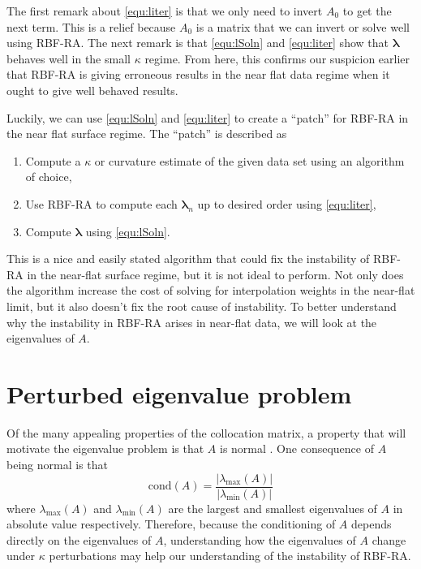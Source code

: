 \documentclass[a4paper,11pt]{article}
\newcommand{\abs}[1]{\left| #1 \right|}
\newcommand{\cond}{\mathrm{cond}}
\newcommand{\bl}{\pmb{\lambda}}
\begin{document}
The first remark about \eqref{equ:liter} is that we only need to invert $ A_0 $ to get the next term. This is a relief because $ A_0 $ is a matrix that we can invert or solve well using RBF-RA. The next remark is that \eqref{equ:lSoln} and \eqref{equ:liter} show that $ \bl $ behaves well in the small $ \kappa $ regime. From here, this confirms our suspicion earlier that RBF-RA is giving erroneous results in the near flat data regime when it ought to give well behaved results.

Luckily, we can use \eqref{equ:lSoln} and \eqref{equ:liter} to create a ``patch'' for RBF-RA in the near flat surface regime. The ``patch'' is described as
\begin{enumerate}[label = (\alph*), itemsep = 0cm, topsep = 0cm]
	\item Compute a $ \kappa $ or curvature estimate of the given data set using an algorithm of choice,
	\item Use RBF-RA to compute each $ \bl_n $ up to desired order using \eqref{equ:liter},
	\item Compute $ \bl $ using \eqref{equ:lSoln}.
\end{enumerate}
This is a nice and easily stated algorithm that could fix the instability of RBF-RA in the near-flat surface regime, but it is not ideal to perform. Not only does the algorithm increase the cost of solving for interpolation weights in the near-flat limit, but it also doesn't fix the root cause of instability. To better understand why the instability in RBF-RA arises in near-flat data, we will look at the eigenvalues of $ A $.

\section{Perturbed eigenvalue problem}
Of the many appealing properties of the collocation matrix, a property that will motivate the eigenvalue problem is that $ A $ is normal \cite{rbf}. One consequence of $ A $ being normal is that 
\[
	\cond(A) = \frac{\abs{\lambda_{\max} (A)}}{\abs{\lambda_{\min} (A)}}
\]
where $ \lambda_{\max} (A) $ and $ \lambda_ {\min} (A) $ are the largest and smallest eigenvalues of $ A $ in absolute value respectively. Therefore, because the conditioning of $ A $ depends directly on the eigenvalues of $ A $, understanding how the eigenvalues of $ A $ change under $ \kappa $ perturbations may help our understanding of the instability of RBF-RA.
\end{document}
